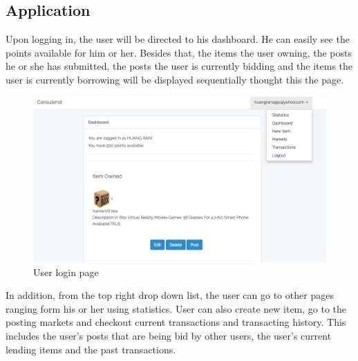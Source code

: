 \subsection{Application}
Upon logging in, the user will be directed to his dashboard. He can easily see the points available for him or her. Besides that, the items the user owning, the posts he or she has submitted, the posts the user is currently bidding and the items the user is currently borrowing will be displayed sequentially thought this the page.\\
\begin{figure}[h]
      \centering
	\includegraphics[scale=0.3]{dashboard.png}
      \caption{User login page}
\end{figure}
In addition, from the top right drop down list, the user can go to other pages ranging form his or her using statistics. User can also create new item, go to the posting markets and checkout current transactions and transacting history. This includes the user's posts that are being bid by other users, the user's current lending items and the past transactions.

